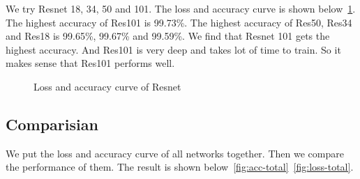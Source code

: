 \documentclass{article}
\begin{document}
We try Resnet 18, 34, 50 and 101. The loss and accuracy curve is shown below~\ref{fig:resnet-curve}. The highest accuracy of Res101 is 99.73\%. The highest accuracy of Res50, Res34 and Res18 is 99.65\%, 99.67\% and 99.59\%. We find that Resnet 101 gets the highest accuracy. And Res101 is very deep and takes lot of time to train. So it makes sense that Res101 performs well. 

\begin{figure}[!htb]
	\centering
{}
\caption{Loss and accuracy curve of  Resnet}
\label{fig:resnet-curve}
\end{figure}

\subsection{Comparisian}

We put the loss and accuracy curve of all networks together. Then we compare the performance of them. The result is shown below~\ref{fig:acc-total}~\ref{fig:loss-total}.
\end{document}

